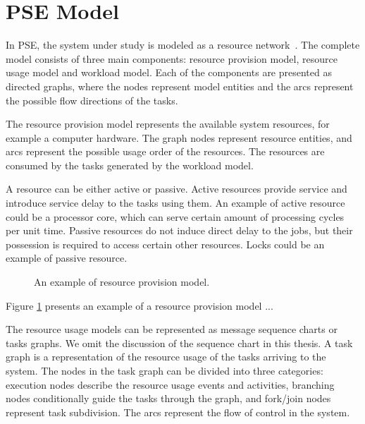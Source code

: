 
\section{PSE Model}

In PSE, the system under study is modeled as a resource network~\cite{Menasce:1994:CPP:174466}. The complete model consists of three main components: resource provision model, resource usage model and workload model. Each of the components are presented as directed graphs, where the nodes represent model entities and the arcs represent the possible flow directions of the tasks.

The resource provision model represents the available system resources, for example a computer hardware. The graph nodes represent resource entities, and arcs represent the possible usage order of the resources. The resources are consumed by the tasks generated by the workload model.

A resource can be either active or passive. Active resources provide service and introduce service delay to the tasks using them. An example of active resource could be a processor core, which can serve certain amount of processing cycles per unit time. Passive resources do not induce direct delay to the jobs, but their possession is required to access certain other resources. Locks  could be an example of passive resource.

\begin{figure}[h!]
  \begin{center}
    \caption{An example of resource provision model.}
    \label{fig:resource-provision-model}
  \end{center}

\end{figure}

Figure \ref{fig:resource-provision-model} presents an example of a resource provision model ...

The resource usage models can be represented as message sequence charts or tasks graphs. We omit the discussion of the sequence chart in this thesis. A task graph is a representation of the resource usage of the tasks arriving to the system. The nodes in the task graph can be divided into three categories: execution nodes describe the resource usage events and activities, branching nodes conditionally guide the tasks through the graph, and fork/join nodes represent task subdivision. The arcs represent the flow of control in the system.

